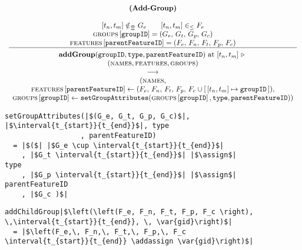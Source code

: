 \begin{figure}
    \renewcommand{\arraystretch}{1.1}
    \sossize$$\begin{array}{c}
      \ntyperule{Add-Group}
      {\\
        \interval{t_n}{t_m} \notinnr G_e \qquad \interval{t_n}{t_m} \inn F_e \\
        \lookup{\groups{}}{\var{groupID}} = (G_e,\, G_t,\, G_p,\, G_c ) \\
        \lookup{\features{}}{\var{parentFeatureID}} = (F_e,\, F_n,\, F_t,\, F_p,\, F_c ) 
      }
      {
        \textbf{addGroup}( \var{groupID}, \var{type}, \var{parentFeatureID} ) \text{ at } \interval{t_n}{t_m} \shove \\
        ( \names{}, \features{}, \groups{} ) \\
        \transition \\
        (\names{}, \\
        \lookup{\features{}}{\var{parentFeatureID}} \assign (F_e,\, F_n,\, F_t,\, F_p ,\, F_c \cup \intervalmapping{t_n}{t_m}{\var{groupID}} ), \\ 
      {\lookup{\groups{}}{\var{groupID}}} \assign 
             \var{setGroupAttributes}( \lookup{\groups{}}{\var{groupID}}, \var{type}, \var{parentFeatureID} )  )
      }
    \end{array}$$
  \caption{\label{rule:add-group}}
\end{figure}

\begin{figure}
  \begin{verbatim}
setGroupAttributes(|$(G_e, G_t, G_p, G_c)$|, |$\interval{t_{start}}{t_{end}}$|, type
                  , parentFeatureID)
  = |$($| |$G_e \cup \interval{t_{start}}{t_{end}}$|
    , |$G_t \interval{t_{start}}{t_{end}}$| |$\assign$| type
    , |$G_p \interval{t_{start}}{t_{end}}$| |$\assign$| parentFeatureID
    , |$G_c )$|
     \end{verbatim}
  \caption{\label{fun:set-group-attributes}}
\end{figure}

\begin{figure}
  \begin{verbatim}
addChildGroup|$\left(\left(F_e, F_n, F_t, F_p, F_c \right), \,\interval{t_{start}}{t_{end}}, \, \var{gid}\right)$|
  = |$\left(F_e,\, F_n,\, F_t,\, F_p,\, F_c \interval{t_{start}}{t_{end}} \addassign \var{gid}\right)$|
  \end{verbatim}
  \caption{\label{fun:add-child-group}}
\end{figure}

